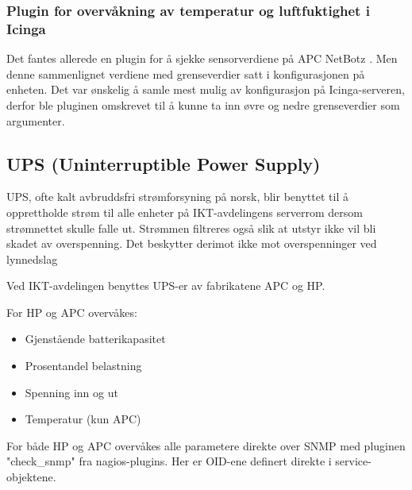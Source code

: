 \subsubsection{Plugin for overvåkning av temperatur og luftfuktighet i Icinga}
Det fantes allerede en plugin for å sjekke sensorverdiene på APC NetBotz \cite{checknetbotz}. Men denne sammenlignet verdiene med grenseverdier satt i konfigurasjonen på enheten. Det var ønskelig å samle mest mulig av konfigurasjon på Icinga-serveren, derfor ble pluginen omskrevet til å kunne ta inn øvre og nedre grenseverdier som argumenter.

\subsection{UPS (Uninterruptible Power Supply)}
UPS, ofte kalt avbruddsfri strømforsyning på norsk, blir benyttet til å opprettholde strøm til alle enheter på IKT-avdelingens serverrom dersom strømnettet skulle falle ut. Strømmen filtreres også slik at utstyr ikke vil bli skadet av overspenning. Det beskytter derimot ikke mot overspenninger ved lynnedslag %

Ved IKT-avdelingen benyttes UPS-er av fabrikatene APC og HP.

For HP og APC overvåkes:
\begin{itemize}
 	\item Gjenstående batterikapasitet
	\item Prosentandel belastning
	\item Spenning inn og ut
	\item Temperatur (kun APC)
\end{itemize}

For både HP og APC overvåkes alle parametere direkte over SNMP med pluginen "check\_snmp" fra nagios-plugins. Her er OID-ene definert direkte i service-objektene.

